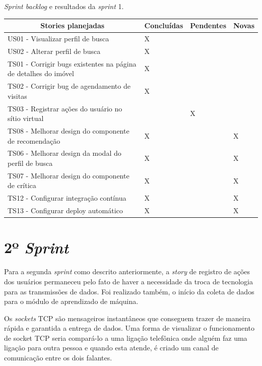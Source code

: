 \begin{quadro}[H]
\centering
\caption[\textit{Sprint backlog} e resultados da \textit{sprint} 1]{\textit{Sprint backlog} e resultados da \textit{sprint} 1.}
\label{quadro:sprint1}
\begin{tabular}{|p{6cm}|p{2cm}|p{2cm}|p{1cm}|}
\hline
\multicolumn{1}{|c|}{\textbf{Stories planejadas}} & \multicolumn{1}{c|}{\textbf{Concluídas}} & \multicolumn{1}{c|}{\textbf{Pendentes}} & \multicolumn{1}{c|}{\textbf{Novas}} \\ \hline
US01 - Visualizar perfil de busca & X &  &  \\ \hline
US02 - Alterar perfil de busca & X &  &  \\ \hline
TS01 - Corrigir bugs existentes na página de detalhes do imóvel & X &  &  \\ \hline
TS02 - Corrigir bug de agendamento de visitas & X &  &  \\ \hline
TS03 - Registrar ações do usuário no sítio virtual &  & X &  \\ \hline
TS08 - Melhorar design do componente de recomendação & X &  & X \\ \hline
TS06 - Melhorar design da modal do perfil de busca & X &  & X \\ \hline
TS07 - Melhorar design do componente de crítica & X &  & X \\ \hline
TS12 - Configurar integração contínua & X &  & X \\ \hline
TS13 - Configurar deploy automático & X &  & X \\ \hline
\end{tabular}
\end{quadro}

\section{2º \textit{Sprint}}

Para a segunda \textit{sprint} como descrito anteriormente, a \textit{story} de registro de ações dos usuários permaneceu pelo fato de haver a necessidade da troca de tecnologia para as transmissões de dados. Foi realizado também, o início da coleta de dados para o módulo de aprendizado de máquina.

Os \textit{sockets} TCP são mensageiros instantâneos que conseguem trazer de maneira rápida e garantida a entrega de dados. Uma forma de visualizar o funcionamento de socket TCP seria compará-lo a uma ligação telefônica onde alguém faz uma ligação para outra pessoa e quando esta atende, é criado um canal de comunicação entre os dois falantes. \cite{Carla:2005}


